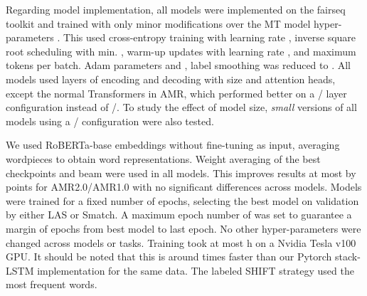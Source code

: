 \documentclass[11pt,a4paper]{article}
\begin{document}
\begin{table}[!t]
\centering
{}
\caption{Test-set performance for Table~\ref{table:dev} selections and prior art on the English Penn-Treebank.}
\label{table:dep-test}
\end{table}

Regarding model implementation, all models were implemented on the fairseq toolkit and trained with only minor modifications over the MT model hyper-parameters \cite{ott2018scaling}. This used cross-entropy training with learning rate , inverse square root scheduling with min. ,  warm-up updates with learning rate , and maximum  tokens per batch. Adam parameters  and , label smoothing was reduced to \footnotemark{}. All models used  layers of encoding and decoding with size  and  attention heads, except the normal Transformers in AMR, which performed better on a / layer configuration instead of /. To study the effect of model size, \textit{small} versions of all models using a / configuration were also tested. 

We used RoBERTa-base \cite{liu2019roberta} embeddings without fine-tuning as input, averaging wordpieces to obtain word representations. Weight averaging of the best  checkpoints \cite{junczys-dowmunt-etal-2016-amu} and beam  were used in all models. This improves results at most by  points for AMR2.0/AMR1.0 with no significant differences across models. Models were trained for a fixed number of epochs, selecting the best model on validation by either LAS or Smatch. A maximum epoch number of  was set to guarantee a margin of  epochs from best model to last epoch. No other hyper-parameters were changed across models or tasks. Training took at most h on a Nvidia Tesla v100 GPU. It should be noted that this is around  times faster than our Pytorch stack-LSTM implementation for the same data. The labeled SHIFT strategy used the  most frequent words. 
\end{document}
